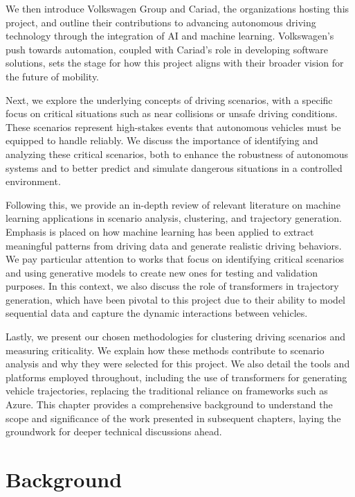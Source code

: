 \documentclass[12pt,a4paper]{report}
\begin{document}
We then introduce Volkswagen Group and Cariad, the organizations hosting this project, and outline their contributions to advancing autonomous driving technology through the integration of AI and machine learning. Volkswagen's push towards automation, coupled with Cariad's role in developing software solutions, sets the stage for how this project aligns with their broader vision for the future of mobility.

Next, we explore the underlying concepts of driving scenarios, with a specific focus on critical situations such as near collisions or unsafe driving conditions. These scenarios represent high-stakes events that autonomous vehicles must be equipped to handle reliably. We discuss the importance of identifying and analyzing these critical scenarios, both to enhance the robustness of autonomous systems and to better predict and simulate dangerous situations in a controlled environment.

Following this, we provide an in-depth review of relevant literature on machine learning applications in scenario analysis, clustering, and trajectory generation. Emphasis is placed on how machine learning has been applied to extract meaningful patterns from driving data and generate realistic driving behaviors. We pay particular attention to works that focus on identifying critical scenarios and using generative models to create new ones for testing and validation purposes. In this context, we also discuss the role of transformers in trajectory generation, which have been pivotal to this project due to their ability to model sequential data and capture the dynamic interactions between vehicles.

Lastly, we present our chosen methodologies for clustering driving scenarios and measuring criticality. We explain how these methods contribute to scenario analysis and why they were selected for this project. We also detail the tools and platforms employed throughout, including the use of transformers for generating vehicle trajectories, replacing the traditional reliance on frameworks such as Azure. This chapter provides a comprehensive background to understand the scope and significance of the work presented in subsequent chapters, laying the groundwork for deeper technical discussions ahead.

\vspace{10em}
\section{Background}
\end{document}
